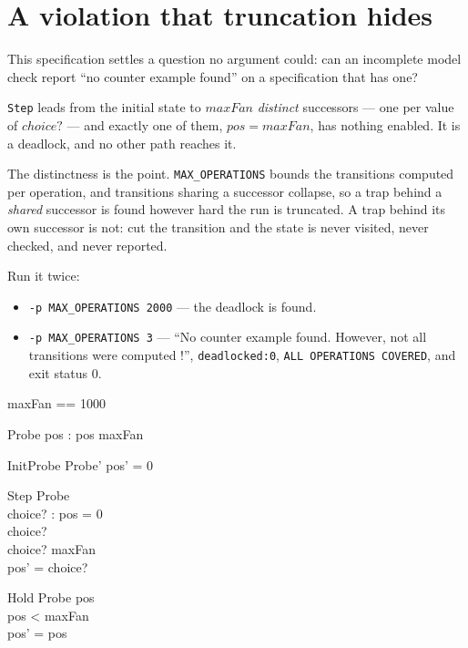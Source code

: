 \documentclass{article}
\begin{document}
\section{A violation that truncation hides}

This specification settles a question no argument could: can an incomplete
model check report ``no counter example found'' on a specification that has
one?

\texttt{Step} leads from the initial state to $maxFan$ \emph{distinct}
successors --- one per value of $choice?$ --- and exactly one of them,
$pos = maxFan$, has nothing enabled. It is a deadlock, and no other path
reaches it.

The distinctness is the point. \texttt{MAX\_OPERATIONS} bounds the transitions
computed per operation, and transitions sharing a successor collapse, so a
trap behind a \emph{shared} successor is found however hard the run is
truncated. A trap behind its own successor is not: cut the transition and the
state is never visited, never checked, and never reported.

Run it twice:

\begin{itemize}
  \item \texttt{-p MAX\_OPERATIONS 2000} --- the deadlock is found.
  \item \texttt{-p MAX\_OPERATIONS 3} --- ``No counter example found. However,
    not all transitions were computed !'', \texttt{deadlocked:0},
    \texttt{ALL OPERATIONS COVERED}, and exit status 0.
\end{itemize}

\begin{zed}
  maxFan == 1000
\end{zed}

\begin{schema}{Probe}
  pos : \nat
\where
  pos \leq maxFan
\end{schema}

\begin{schema}{InitProbe}
  Probe'
\where
  pos' = 0
\end{schema}

\begin{schema}{Step}
  \Delta Probe \\
  choice? : \nat
\where
  pos = 0 \\
  choice?  \\
  choice? \leq maxFan \\
  pos' = choice?
\end{schema}

\begin{schema}{Hold}
  \Delta Probe
\where
  pos  \\
  pos < maxFan \\
  pos' = pos
\end{schema}
\end{document}
